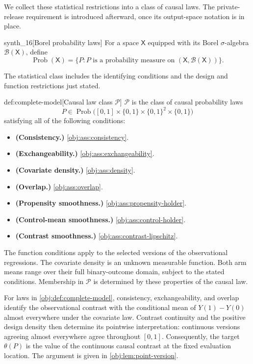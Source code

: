We collect these statistical restrictions into a class of causal laws. The private-release requirement is introduced afterward, once its output-space notation is in place.

\begin{definitionv}{synth_16}[Borel probability laws]
For a space \(\mathsf X\) equipped with its Borel \(\sigma\)-algebra \(\mathcal B(\mathsf X)\), define
\[
\operatorname{Prob}(\mathsf X)
=
\{P:P\text{ is a probability measure on }(\mathsf X,\mathcal B(\mathsf X))\}.
\]
\end{definitionv}

The statistical class includes the identifying conditions and the design and function restrictions just stated.

\begin{definitionv}{def:complete-model}[Causal law class \(\mathcal P\)]
\(\mathcal P\) is the class of causal probability laws
\[
P\in\operatorname{Prob}
\bigl([0,1]\times\{0,1\}\times\{0,1\}^2\times\{0,1\}\bigr)
\]
satisfying all of the following conditions:
\begin{itemize}
\item \textbf{(Consistency.)} \cref{obj:ass:consistency}.
\item \textbf{(Exchangeability.)} \cref{obj:ass:exchangeability}.
\item \textbf{(Covariate density.)} \cref{obj:ass:density}.
\item \textbf{(Overlap.)} \cref{obj:ass:overlap}.
\item \textbf{(Propensity smoothness.)} \cref{obj:ass:propensity-holder}.
\item \textbf{(Control-mean smoothness.)} \cref{obj:ass:control-holder}.
\item \textbf{(Contrast smoothness.)} \cref{obj:ass:contrast-lipschitz}.
\end{itemize}
The function conditions apply to the selected versions of the observational regressions. The covariate density is an unknown measurable function. Both arm means range over their full binary-outcome domain, subject to the stated conditions. Membership in \(\mathcal P\) is determined by these properties of the causal law.
\end{definitionv}

For laws in \cref{obj:def:complete-model}, consistency, exchangeability, and overlap identify the observational contrast with the conditional mean of \(Y(1)-Y(0)\) almost everywhere under the covariate law. Contrast continuity and the positive design density then determine its pointwise interpretation: continuous versions agreeing almost everywhere agree throughout \([0,1]\). Consequently, the target \(\theta(P)\) is the value of the continuous causal contrast at the fixed evaluation location. The argument is given in \cref{obj:lem:point-version}.

